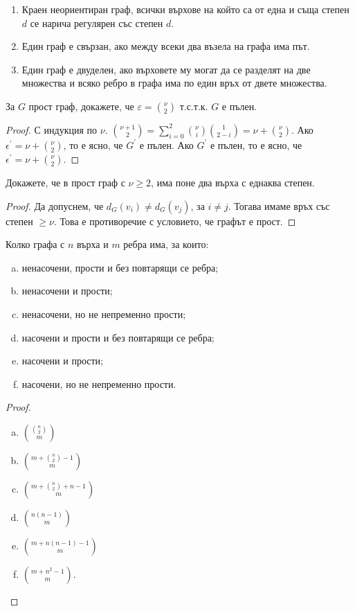 \begin{dfn}
  \begin{enumerate}
  \item
    Краен неориентиран граф, всички върхове на който са от една и съща степен $d$ се нарича регулярен със степен $d$.  
  \item
    Един граф е свързан, ако между всеки два възела на графа има път.
  \item
    Един граф е двуделен, ако върховете му могат да се разделят на две множества и всяко ребро в графа има по един връх от двете множества.
\end{enumerate}
\end{dfn}


\begin{problem}
  За $G$ прост граф, докажете, че $\varepsilon = \binom{\nu}{2}$ т.с.т.к. $G$ е пълен.
\end{problem}
\begin{proof}
  С индукция по $\nu$.
  $\binom{\nu+1}{2} = \sum^2_{i=0}\binom{\nu}{i}\binom{1}{2-i} = \nu + \binom{\nu}{2}$.
  Ако $\epsilon^\prime =\nu + \binom{\nu}{2}$, то е ясно, че $G^\prime$ е пълен.
  Ако $G^\prime$ е пълен, то е ясно, че $\epsilon^\prime = \nu + \binom{\nu}{2}$.
\end{proof}


\begin{problem}
  Докажете, че в прост граф с $\nu\geq 2$, има поне два върха с еднаква степен.
\end{problem}
\begin{proof}
  Да допуснем, че $d_G(v_i)\neq d_G(v_j)$, за $i\neq j$.
  Тогава имаме връх със степен $\geq \nu$. Това е противоречие с условието, че графът е прост.
\end{proof}

\begin{problem}
  Колко графа с $n$ върха и $m$ ребра има, за които:
  \begin{enumerate}[a)]
  \item
    ненасочени, прости и без повтарящи се ребра;
  \item
    ненасочени и прости;
  \item
    ненасочени, но не непременно прости;
  \item
    насочени и прости и без повтарящи се ребра;
  \item
    насочени и прости;
  \item
    насочени, но не непременно прости.
\end{enumerate}
\end{problem}
\begin{proof}
  \begin{enumerate}[a)]
  \item
    $\binom{\binom{n}{2}}{m}$
  \item
    $\binom{m+\binom{n}{2}-1}{m}$
  \item
    $\binom{m+\binom{n}{2}+n-1}{m}$
  \item
    $\binom{n(n-1)}{m}$
  \item
    $\binom{m+n(n-1)-1}{m}$
  \item
    $\binom{m+n^2-1}{m}$.
  \end{enumerate}
\end{proof}

